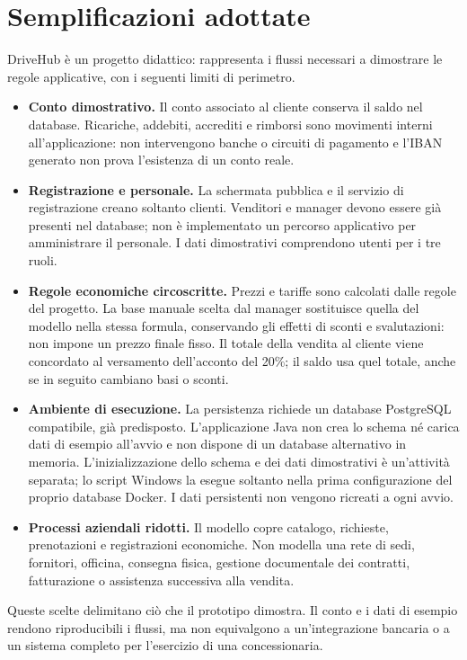 \section{Semplificazioni adottate}\label{sec:semplificazioni}
DriveHub è un progetto didattico: rappresenta i flussi necessari a dimostrare le regole applicative, con i seguenti limiti di perimetro.
\begin{itemize}
  \item \textbf{Conto dimostrativo.} Il conto associato al cliente conserva il saldo nel database. Ricariche, addebiti, accrediti e rimborsi sono movimenti interni all'applicazione: non intervengono banche o circuiti di pagamento e l'IBAN generato non prova l'esistenza di un conto reale.
  \item \textbf{Registrazione e personale.} La schermata pubblica e il servizio di registrazione creano soltanto clienti. Venditori e manager devono essere già presenti nel database; non è implementato un percorso applicativo per amministrare il personale. I dati dimostrativi comprendono utenti per i tre ruoli.
  \item \textbf{Regole economiche circoscritte.} Prezzi e tariffe sono calcolati dalle regole del progetto. La base manuale scelta dal manager sostituisce quella del modello nella stessa formula, conservando gli effetti di sconti e svalutazioni: non impone un prezzo finale fisso. Il totale della vendita al cliente viene concordato al versamento dell'acconto del 20\%; il saldo usa quel totale, anche se in seguito cambiano basi o sconti.
  \item \textbf{Ambiente di esecuzione.} La persistenza richiede un database PostgreSQL compatibile, già predisposto. L'applicazione Java non crea lo schema né carica dati di esempio all'avvio e non dispone di un database alternativo in memoria. L'inizializzazione dello schema e dei dati dimostrativi è un'attività separata; lo script Windows la esegue soltanto nella prima configurazione del proprio database Docker. I dati persistenti non vengono ricreati a ogni avvio.
  \item \textbf{Processi aziendali ridotti.} Il modello copre catalogo, richieste, prenotazioni e registrazioni economiche. Non modella una rete di sedi, fornitori, officina, consegna fisica, gestione documentale dei contratti, fatturazione o assistenza successiva alla vendita.
\end{itemize}

Queste scelte delimitano ciò che il prototipo dimostra. Il conto e i dati di esempio rendono riproducibili i flussi, ma non equivalgono a un'integrazione bancaria o a un sistema completo per l'esercizio di una concessionaria.
